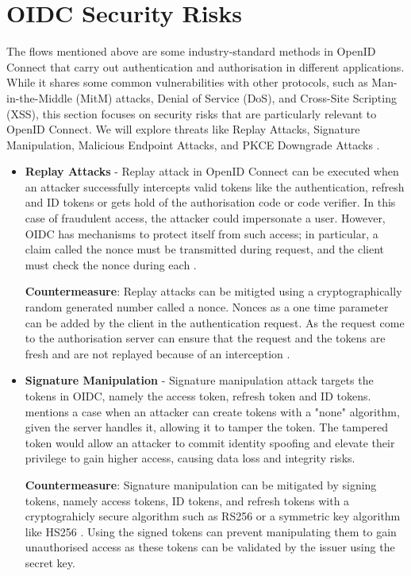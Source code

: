 \section{OIDC Security Risks}

The flows mentioned above are some industry-standard methods in OpenID Connect that carry out authentication and authorisation in different applications. While it shares some common vulnerabilities with other protocols, such as Man-in-the-Middle (MitM) attacks, Denial of Service (DoS), and Cross-Site Scripting (XSS), this section focuses on security risks that are particularly relevant to OpenID Connect. We will explore threats like Replay Attacks, Signature Manipulation, Malicious Endpoint Attacks, and PKCE Downgrade Attacks \citep{oidc_attacks}. 

\begin{itemize}
    \item \textbf{Replay Attacks} - Replay attack in OpenID Connect can be executed when an attacker successfully intercepts valid tokens like the authentication, refresh and ID tokens or gets hold of the authorisation code or code verifier. In this case of fraudulent access, the attacker could impersonate a user. However, OIDC has mechanisms to protect itself from such access; in particular, a claim called the nonce must be transmitted during request, and the client must check the nonce during each \citep{oidc_attacks}. \newline

    \textbf{Countermeasure}: Replay attacks can be mitigted using a cryptographically random generated number called a nonce. Nonces as a one time parameter can be added by the client in the authentication request. As the request come to the authorisation server can ensure that the request and the tokens are fresh and are not replayed because of an interception \citep{oidc_attacks}.
    
    \item \textbf{Signature Manipulation} - Signature manipulation attack targets the tokens in OIDC, namely the access token, refresh token and ID tokens. \cite{oidc_attacks} mentions a case when an attacker can create tokens with a "none" algorithm, given the server handles it, allowing it to tamper the token. The tampered token would allow an attacker to commit identity spoofing and elevate their privilege to gain higher access, causing data loss and integrity risks.\newline

    \textbf{Countermeasure}: Signature manipulation can be mitigated by signing tokens, namely access tokens, ID tokens, and refresh tokens with a cryptograhicly 
    secure algorithm such as RS256 or a symmetric key algorithm like HS256 \citep{signed_token}. Using the signed tokens can prevent manipulating them to gain unauthorised access as these tokens can be validated by the issuer using the secret key.
    

\end{itemize}
